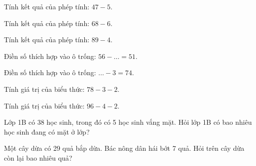\begin{ex}
Tính kết quả của phép tính: $47 - 5$.
\end{ex}

\begin{ex}
Tính kết quả của phép tính: $68 - 6$.
\end{ex}

\begin{ex}
Tính kết quả của phép tính: $89 - 4$.
\end{ex}

\begin{ex}
Điền số thích hợp vào ô trống: $56 - \dots = 51$.
\end{ex}

\begin{ex}
Điền số thích hợp vào ô trống: $\dots - 3 = 74$.
\end{ex}

\begin{ex}
Tính giá trị của biểu thức: $78 - 3 - 2$.
\end{ex}

\begin{ex}
Tính giá trị của biểu thức: $96 - 4 - 2$.
\end{ex}

\begin{ex}
Lớp 1B có 38 học sinh, trong đó có 5 học sinh vắng mặt. Hỏi lớp 1B có bao nhiêu học sinh đang có mặt ở lớp?
\end{ex}

\begin{ex}
Một cây dừa có 29 quả bắp dừa. Bác nông dân hái bớt 7 quả. Hỏi trên cây dừa còn lại bao nhiêu quả?
\end{ex}

